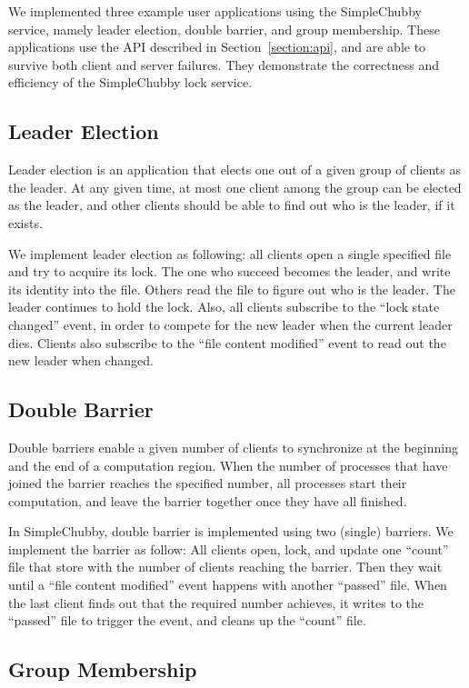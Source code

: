 We implemented three example user applications using the SimpleChubby service,
namely leader election, double barrier, and group membership.
These applications use the API described in Section~\ref{section:api},
and are able to survive both client and server failures. They demonstrate
the correctness and efficiency of the SimpleChubby lock service.

\subsection{Leader Election}

Leader election is an application that elects one out of a given group
of clients as the leader. At any given time, at most one client among the
group can be elected as the leader, and other clients should be able to
find out who is the leader, if it exists.

We implement leader election as following: all clients open a single
specified file and try to acquire its lock. The one who succeed becomes
the leader, and write its identity into the file. Others read the file
to figure out who is the leader. The leader continues to hold the lock.
Also, all clients subscribe to the ``lock state changed'' event, in order
to compete for the new leader when the current leader dies. Clients also
subscribe to the ``file content modified'' event to read out the new
leader when changed.

\subsection{Double Barrier}

Double barriers enable a given number of clients to synchronize at the
beginning and the end of a computation region. When the number of processes
that have joined the barrier reaches the specified number, all processes
start their computation, and leave the barrier together once they have all
finished.

In SimpleChubby, double barrier is implemented using two (single) barriers.
We implement the barrier as follow: All clients open, lock, and update
one ``count'' file that store with the number of clients reaching the barrier.
Then they wait until a ``file content modified'' event happens with another
``passed'' file. When the last client finds out that the required number
achieves, it writes to the ``passed'' file to trigger the event, and cleans
up the ``count'' file.

\subsection{Group Membership}

